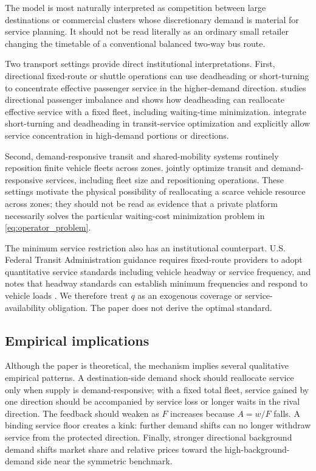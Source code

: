 The model is most naturally interpreted as competition between large destinations or commercial clusters whose discretionary demand is material for service planning. It should not be read literally as an ordinary small retailer changing the timetable of a conventional balanced two-way bus route.

Two transport settings provide direct institutional interpretations. First, directional fixed-route or shuttle operations can use deadheading or short-turning to concentrate effective passenger service in the higher-demand direction. \citet{furth1985} studies directional passenger imbalance and shows how deadheading can reallocate effective service with a fixed fleet, including waiting-time minimization. \citet{cortes2011} integrate short-turning and deadheading in transit-service optimization and explicitly allow service concentration in high-demand portions or directions.

Second, demand-responsive transit and shared-mobility systems routinely reposition finite vehicle fleets across zones. \citet{liuouyang2021} jointly optimize transit and demand-responsive services, including fleet size and repositioning operations. These settings motivate the physical possibility of reallocating a scarce vehicle resource across zones; they should not be read as evidence that a private platform necessarily solves the particular waiting-cost minimization problem in \eqref{eq:operator_problem}.

The minimum service restriction also has an institutional counterpart. U.S. Federal Transit Administration guidance requires fixed-route providers to adopt quantitative service standards including vehicle headway or service frequency, and notes that headway standards can establish minimum frequencies and respond to vehicle loads \citep{fta2012}. We therefore treat $q$ as an exogenous coverage or service-availability obligation. The paper does not derive the optimal standard.

\subsection{Empirical implications}

Although the paper is theoretical, the mechanism implies several qualitative empirical patterns. A destination-side demand shock should reallocate service only when supply is demand-responsive; with a fixed total fleet, service gained by one direction should be accompanied by service loss or longer waits in the rival direction. The feedback should weaken as $F$ increases because $A=w/F$ falls. A binding service floor creates a kink: further demand shifts can no longer withdraw service from the protected direction. Finally, stronger directional background demand shifts market share and relative prices toward the high-background-demand side near the symmetric benchmark.

